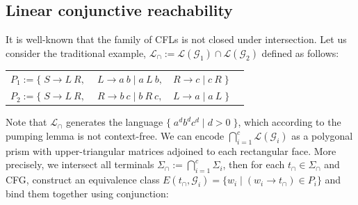 \documentclass[sigplan,review,anonymous,acmsmall]{acmart}\settopmatter{printfolios=false,printccs=false,printacmref=false}
\begin{document}
\subsection{Linear conjunctive reachability}\label{sec:lclreach}

It is well-known that the family of CFLs is not closed under intersection. Let us consider the traditional example, $\mathcal{L}_\cap := \mathcal{L}(\mathcal{G}_1) \cap \mathcal{L}(\mathcal{G}_2)$ defined as follows:

\begin{table}[H]
\begin{tabular}{llll}
$P_1 := \big\{\;S \rightarrow L\:R,$ & $\:L \rightarrow a\:b \mid a\:L\:b,$ & $R \rightarrow c \mid c \:R\;\big\}$\vspace{5pt}\\
$P_2 := \big\{\;S \rightarrow L\:R,$ & $\:R \rightarrow b\:c \mid b\:R\:c,$ & $L \rightarrow a \mid a \:L\;\big\}$
\end{tabular}
\end{table}

\noindent Note that $\mathcal{L}_\cap$ generates the language $\big\{\;a^d b^d c^d \mid d > 0\;\big\}$, which according to the pumping lemma is not context-free. We can encode $\bigcap_{i=1}^c \mathcal{L}(\mathcal{G}_i)$ as a polygonal prism with upper-triangular matrices adjoined to each rectangular face. More precisely, we intersect all terminals $\Sigma_\cap := \bigcap_{i=1}^c \Sigma_i$, then for each $t_\cap \in \Sigma_\cap$ and CFG, construct an equivalence class $E(t_\cap, \mathcal{G}_i) = \{ w_i \mid (w_i \rightarrow t_\cap) \in P_i\}$ and bind them together using conjunction:\vspace{-5pt}
\end{document}
